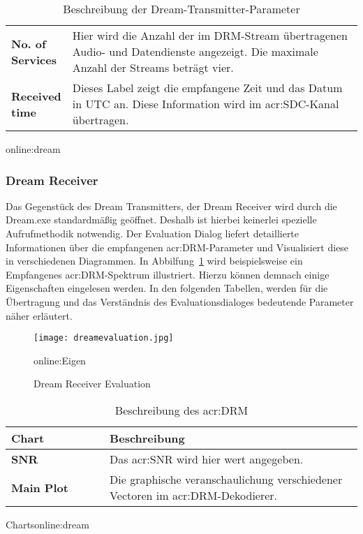 \begin{table}[H]
\begin{center}
\begin{tabular}{p{0.17\linewidth}  p{0.83\linewidth}}
			\textbf{No. of Services} & Hier wird die Anzahl der im DRM-Stream übertragenen Audio- und Datendienste angezeigt. Die maximale Anzahl der Streams beträgt vier.\\
		
			\textbf{Received time} & Dieses Label zeigt die empfangene Zeit und das Datum in UTC an. Diese Information wird im \gls{acr:SDC}-Kanal übertragen.\\
			\bottomrule
		\end{tabular}
		\caption{Beschreibung der Dream-Transmitter-Parameter}\gls{online:dream}
		\label{tab:dreamparam}
	\end{center}
\end{table}

\newpage
\subsubsection{Dream Receiver}
\label{subsec:Unterabschnitt12}

Das Gegenstück des Dream Transmitters, der Dream Receiver wird durch die Dream.exe standardmäßig geöffnet. Deshalb ist hierbei keinerlei spezielle Aufrufmethodik notwendig. Der Evaluation Dialog liefert detaillierte Informationen über die empfangenen \gls{acr:DRM}-Parameter und Visualisiert diese in verschiedenen Diagrammen. In Abbilfung~\ref{fig:dreamevaluation} wird beispielsweise ein Empfangenes \gls{acr:DRM}-Spektrum illustriert. Hierzu können demnach einige Eigenschaften eingelesen werden. In den folgenden Tabellen, werden für die Übertragung und das Verständnis des Evaluationsdialoges bedeutende Parameter näher erläutert.


\begin{figure}[H]
	\centering
	\texttt{[image: dreamevaluation.jpg]}
	\caption[Dream Receiver Evaluation]{Dream Receiver Evaluation}\gls{online:Eigen}
	\label{fig:dreamevaluation}
\end{figure}



\begin{table}[ht]
	\begin{center}
		\begin{tabular}{p{0.28\linewidth}  p{0.72\linewidth}}
			\toprule
			\textbf{Chart} & \textbf{Beschreibung} \\
			\midrule
			\textbf{SNR} & Das \gls{acr:SNR} wird hier wert angegeben.\\
			\textbf{Main Plot} & Die graphische veranschaulichung verschiedener Vectoren im \gls{acr:DRM}-Dekodierer. \\
			\bottomrule
		\end{tabular}
		\caption{Beschreibung des \gls{acr:DRM}}Charts\gls{online:dream}
		\label{tab:drmchart}
	\end{center}
\end{table}


